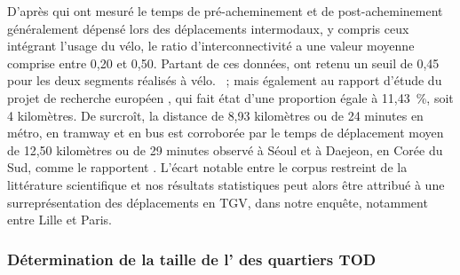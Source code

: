 \begin{refsegment}
{    D'après \textcolor{blue}{\textcite[274]{krygsman_multimodal_2004}} qui ont mesuré le temps de pré-acheminement et de post-acheminement généralement dépensé lors des déplacements intermodaux, y compris ceux intégrant l'usage du vélo, le ratio d'interconnectivité a une valeur moyenne comprise entre 0,20 et 0,50. Partant de ces données, \textcolor{blue}{\textcite[116]{nigro_land_2019}} ont retenu un seuil de 0,45 pour les deux segments réalisés à vélo.
}~; mais également au rapport d'étude du projet de recherche européen \textcolor{blue}{\textcite[20 ; 28]{bitibi_bike_2017}}, qui fait état d'une proportion égale à 11,43~\%, soit 4 kilomètres. De surcroît, la distance de 8,93 kilomètres ou de 24 minutes en métro, en tramway et en bus est corroborée par le temps de déplacement moyen de 12,50 kilomètres ou de 29 minutes observé à Séoul et à Daejeon, en Corée du Sud, comme le rapportent \textcolor{blue}{\textcite[46]{lee_strategies_2010}}. L'écart notable entre le corpus restreint de la littérature scientifique et nos résultats statistiques peut alors être attribué à une surreprésentation des déplacements en \acrshort{TGV}, dans notre enquête, notamment entre Lille et Paris.%

\subsubsection*{Détermination de la taille de l' des quartiers TOD
    \label{chap5:taille-aire-secondaire}
    }


\end{refsegment}
